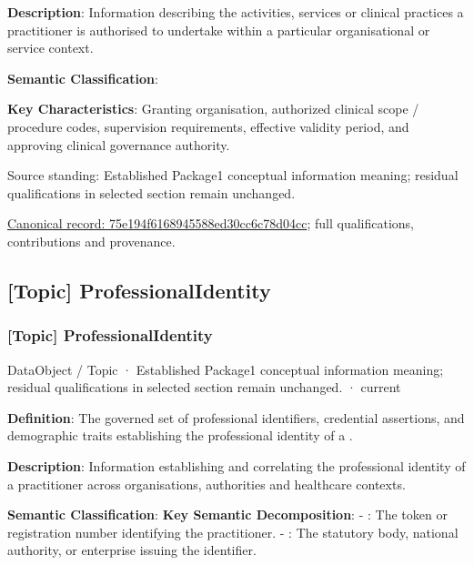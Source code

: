 \textbf{Description}: Information describing the activities, services or clinical practices a practitioner is authorised to undertake within a particular organisational or service context.



\textbf{Semantic Classification}: \texttt{}



\textbf{Key Characteristics}: Granting organisation, authorized clinical scope / procedure codes, supervision requirements, effective validity period, and approving clinical governance authority.



Source standing: Established Package1 conceptual information meaning; residual qualifications in selected section remain unchanged.


{\footnotesize \href{../../../../continuum/application/data-object/topic/75e194f6168945588ed30cc6c78d04cc.md}{Canonical record: 75e194f6168945588ed30cc6c78d04cc}; full qualifications, contributions and provenance.}\par
\subsection{[Topic] ProfessionalIdentity}

\subsubsection{[Topic] ProfessionalIdentity}

\label{element:2f2868f077fc47afbb541925a9801b2c}
{\small DataObject / Topic · Established Package1 conceptual information meaning; residual qualifications in selected section remain unchanged. · current}\par

\textbf{Definition}: The governed set of professional identifiers, credential assertions, and demographic traits establishing the professional identity of a \texttt{}.



\textbf{Description}: Information establishing and correlating the professional identity of a practitioner across organisations, authorities and healthcare contexts.



\textbf{Semantic Classification}: \texttt{}
\textbf{Key Semantic Decomposition}:
  - \texttt{}: The token or registration number identifying the practitioner.
  - \texttt{}: The statutory body, national authority, or enterprise issuing the identifier.



